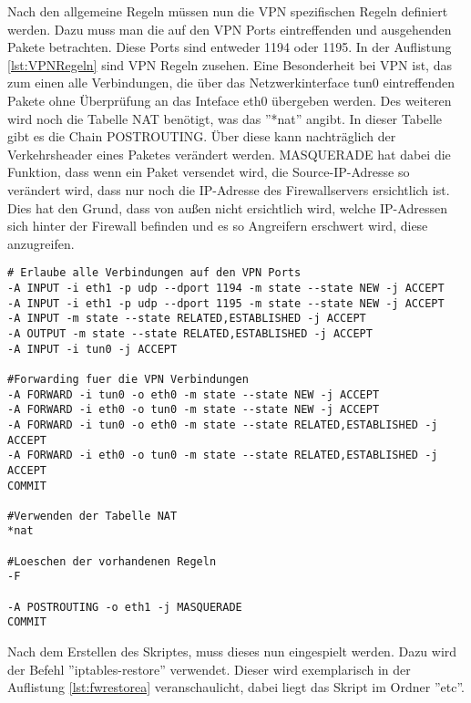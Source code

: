 Nach den allgemeine Regeln müssen nun die VPN spezifischen Regeln definiert werden. Dazu muss man die auf den VPN Ports eintreffenden und ausgehenden Pakete betrachten. Diese Ports sind entweder 1194 oder 1195. In der Auflistung \ref{lst:VPNRegeln} sind VPN Regeln zusehen. Eine Besonderheit bei VPN ist, das zum einen alle Verbindungen, die über das Netzwerkinterface tun0 eintreffenden Pakete ohne Überprüfung an das Inteface eth0 übergeben werden. Des weiteren wird noch die Tabelle NAT benötigt, was das ''*nat'' angibt. In dieser Tabelle gibt es die Chain POSTROUTING. Über diese kann nachträglich der Verkehrsheader eines Paketes verändert werden. MASQUERADE hat dabei die Funktion, dass wenn ein Paket versendet wird, die Source-IP-Adresse so verändert wird, dass nur noch die IP-Adresse des Firewallservers ersichtlich ist. Dies hat den Grund, dass von außen nicht ersichtlich wird, welche IP-Adressen sich hinter der Firewall befinden und es so Angreifern erschwert wird, diese anzugreifen.
\newline
\lstset{
	basicstyle=\footnotesize, frame=tb,
	xleftmargin=.01\textwidth, xrightmargin=.01\textwidth
}
\begin{lstlisting}[caption={Weitere VPN Firewallregeln},label=lst:VPNRegeln]
# Erlaube alle Verbindungen auf den VPN Ports
-A INPUT -i eth1 -p udp --dport 1194 -m state --state NEW -j ACCEPT
-A INPUT -i eth1 -p udp --dport 1195 -m state --state NEW -j ACCEPT
-A INPUT -m state --state RELATED,ESTABLISHED -j ACCEPT
-A OUTPUT -m state --state RELATED,ESTABLISHED -j ACCEPT
-A INPUT -i tun0 -j ACCEPT

#Forwarding fuer die VPN Verbindungen
-A FORWARD -i tun0 -o eth0 -m state --state NEW -j ACCEPT
-A FORWARD -i eth0 -o tun0 -m state --state NEW -j ACCEPT
-A FORWARD -i tun0 -o eth0 -m state --state RELATED,ESTABLISHED -j ACCEPT
-A FORWARD -i eth0 -o tun0 -m state --state RELATED,ESTABLISHED -j ACCEPT
COMMIT

#Verwenden der Tabelle NAT
*nat

#Loeschen der vorhandenen Regeln
-F

-A POSTROUTING -o eth1 -j MASQUERADE
COMMIT
\end{lstlisting}
\vspace{\baselineskip}
Nach dem Erstellen des Skriptes, muss dieses nun eingespielt werden. Dazu wird der Befehl ''iptables-restore'' verwendet. Dieser wird exemplarisch in der Auflistung \ref{lst:fwrestorea} veranschaulicht, dabei liegt das Skript im Ordner ''etc''.
\newline
\lstset{
	basicstyle=\footnotesize, frame=tb,
	xleftmargin=.2\textwidth, xrightmargin=.2\textwidth
}
